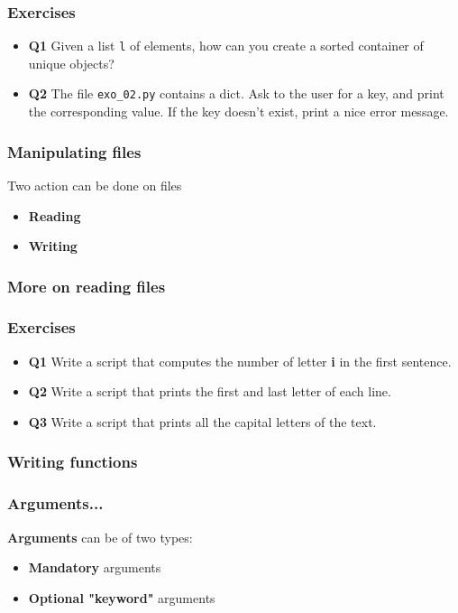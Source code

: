\documentclass[xcolor=dvipsnames]{beamer}
\begin{document}
\begin{frame}
\frametitle{Exercises}
\begin{itemize}
\item \textbf{Q1} Given a list \texttt{l} of elements, how can you create a
sorted container of unique objects?
\item \textbf{Q2} The file \texttt{exo\_02.py} contains a dict. Ask to the
user for a key, and print the corresponding value. If the key doesn't exist,
print a nice error message.
\end{itemize}
\end{frame}


\begin{frame}
\frametitle{Manipulating files}
Two action can be done on files
\begin{itemize}
\item \textbf{Reading}

\item \textbf{Writing}

\end{itemize}
\end{frame}

\begin{frame}
\frametitle{More on reading files}

\end{frame}

\begin{frame}
\frametitle{Exercises}
\begin{itemize}
\item \textbf{Q1} Write a script that computes the number of letter \textbf{i}
in the first sentence.
\item \textbf{Q2} Write a script that prints the first and last letter of each
line.
\item \textbf{Q3} Write a script that prints all the capital letters of the
text.
\end{itemize}
\end{frame}

\begin{frame}
\frametitle{Writing functions}

\end{frame}

\begin{frame}
\frametitle{Arguments...}
\textbf{Arguments} can be of two types:
\begin{itemize}
\item \textbf{Mandatory} arguments
\item \textbf{Optional "keyword"} arguments
\end{itemize}


\end{frame}
\end{document}
